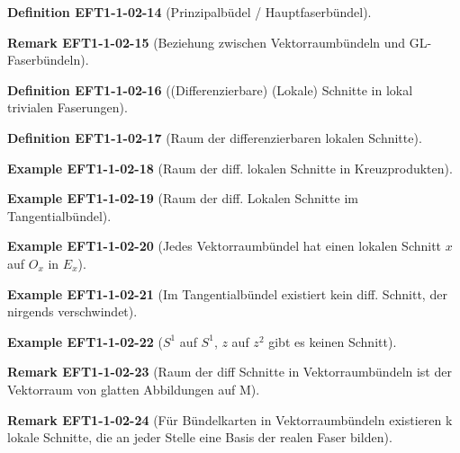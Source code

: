 \documentclass[10pt, letterpaper]{article}
\newcommand{\CustomHeading}[3]{%
  \par\medskip\noindent%
  \textbf{#1 #2} \textnormal{(#3)}.\enskip%
}
\newenvironment{DEF}[2]{\CustomHeading{Definition}{#1}{#2}}{}
\newenvironment{REM}[2]{\CustomHeading{Remark}{#1}{#2}}{}
\newenvironment{EXA}[2]{\CustomHeading{Example}{#1}{#2}}{}
\begin{document}
\begin{DEF}{EFT1-1-02-14}{Prinzipalbüdel / Hauptfaserbündel}
\end{DEF}

\begin{REM}{EFT1-1-02-15}{Beziehung zwischen Vektorraumbündeln und GL-Faserbündeln}
\end{REM}

\begin{DEF}{EFT1-1-02-16}{(Differenzierbare) (Lokale) Schnitte in lokal trivialen Faserungen}
\end{DEF}

\begin{DEF}{EFT1-1-02-17}{Raum der differenzierbaren lokalen Schnitte}
\end{DEF}

\begin{EXA}{EFT1-1-02-18}{Raum der diff. lokalen Schnitte in Kreuzprodukten}
\end{EXA}

\begin{EXA}{EFT1-1-02-19}{Raum der diff. Lokalen Schnitte im Tangentialbündel}
\end{EXA}

\begin{EXA}{EFT1-1-02-20}{Jedes Vektorraumbündel hat einen lokalen Schnitt $x$ auf $O_x$ in $E_x$}
\end{EXA}

\begin{EXA}{EFT1-1-02-21}{Im Tangentialbündel existiert kein diff. Schnitt, der nirgends verschwindet}
\end{EXA}

\begin{EXA}{EFT1-1-02-22}{$S^1$ auf $S^1$, $z$ auf $z^2$ gibt es keinen Schnitt}
\end{EXA}

\begin{REM}{EFT1-1-02-23}{Raum der diff Schnitte in Vektorraumbündeln ist der Vektorraum von glatten Abbildungen auf M}
\end{REM}

\begin{REM}{EFT1-1-02-24}{Für Bündelkarten in Vektorraumbündeln existieren k lokale Schnitte, die an jeder Stelle eine Basis der realen Faser bilden}
\end{REM}
\end{document}
